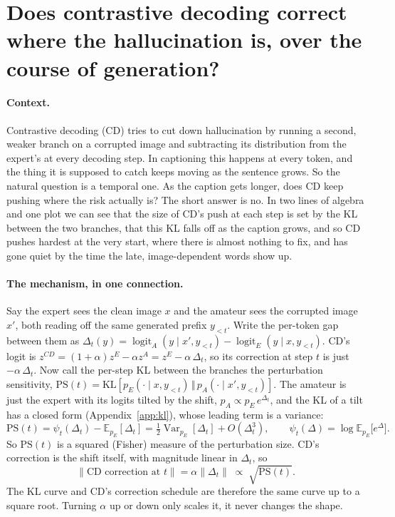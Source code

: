 \documentclass[11pt]{article}
\begin{document}
\section{Does contrastive decoding correct where the hallucination is,
over the course of generation?}

\paragraph{Context.}
Contrastive decoding (CD) tries to cut down hallucination by running a second,
weaker branch on a corrupted image and subtracting its distribution from the
expert's at every decoding step. In captioning this happens at every token, and the
thing it is supposed to catch keeps moving as the sentence grows. So the natural
question is a temporal one. As the caption gets longer, does CD keep pushing where
the risk actually is? The short answer is no. In two lines of algebra and one plot
we can see that the size of CD's push at each step is set by the KL between the two
branches, that this KL falls off as the caption grows, and so CD pushes hardest at
the very start, where there is almost nothing to fix, and has gone quiet by the time
the late, image-dependent words show up.

\paragraph{The mechanism, in one connection.}
Say the expert sees the clean image $x$ and the amateur sees the corrupted image
$x'$, both reading off the same generated prefix $y_{<t}$. Write the per-token gap
between them as $\Delta_t(y)=\operatorname{logit}_A(y\mid x',y_{<t})-
\operatorname{logit}_E(y\mid x,y_{<t})$. CD's logit is $z^{CD}=(1{+}\alpha)z^{E}-
\alpha z^{A}=z^{E}-\alpha\,\Delta_t$, so its correction at step $t$ is just
$-\alpha\,\Delta_t$. Now call the per-step KL between the branches the perturbation
sensitivity, $\mathrm{PS}(t)=\mathrm{KL}[p_E(\cdot\mid x,y_{<t})\,\Vert\,p_A(\cdot
\mid x',y_{<t})]$. The amateur is just the expert with its logits tilted by the
shift, $p_A\propto p_E\,e^{\Delta_t}$, and the KL of a tilt has a closed form
(Appendix~\ref{app:kl}), whose leading term is a variance:
\begin{equation}
\mathrm{PS}(t)=\psi_t(\Delta_t)-\mathbb{E}_{p_E}[\Delta_t]
             =\tfrac12\operatorname{Var}_{p_E}[\Delta_t]+O(\Delta_t^3),
\qquad \psi_t(\Delta)=\log\mathbb{E}_{p_E}\big[e^{\Delta}\big].
\label{eq:kl}
\end{equation}
So $\mathrm{PS}(t)$ is a squared (Fisher) measure of the perturbation size. CD's
correction is the shift itself, with magnitude linear in $\Delta_t$, so
\begin{equation}
\big\lVert\text{CD correction at }t\big\rVert
   =\alpha\lVert\Delta_t\rVert \;\propto\; \sqrt{\mathrm{PS}(t)}.
\label{eq:prop}
\end{equation}
The KL curve and CD's correction schedule are therefore the same curve up to a
square root. Turning $\alpha$ up or down only scales it, it never changes the shape.
\end{document}
